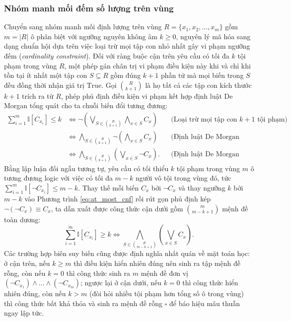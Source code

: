 \subsubsection{Nhóm manh mối đếm số lượng trên vùng}
Chuyển sang nhóm manh mối định lượng trên vùng $R = \{x_1, x_2, \dots, x_m\}$ gồm
$m = |R|$ ô phân biệt với ngưỡng nguyên không âm $k \ge 0$, nguyên lý mã hóa sang
dạng chuẩn hội dựa trên việc loại trừ mọi tập con nhỏ nhất gây vi phạm ngưỡng đếm
(\textit{cardinality constraint}). Đối với ràng buộc cận trên yêu cầu có tối đa
$k$ tội phạm trong vùng $R$, một phép gán chân trị vi phạm điều kiện này khi và
chỉ khi tồn tại ít nhất một tập con $S \subseteq R$ gồm đúng $k + 1$ phần tử mà
mọi biến trong $S$ đều đồng thời nhận giá trị $\text{True}$. Gọi $\binom{R}{k+1}$
là họ tất cả các tập con kích thước $k + 1$ trích ra từ $R$, phép phủ định điều
kiện vi phạm kết hợp định luật De Morgan tổng quát cho ta chuỗi biến đổi tương
đương:
\begin{align}
    \sum_{i=1}^{m} \mathbb{I}[C_{x_i}] \le k
    &\iff \neg \left( \bigvee_{S \in \binom{R}{k+1}} \bigwedge_{x \in S} C_x \right)
        && \text{(Loại trừ mọi tập con $k+1$ tội phạm)} \nonumber\\
    &\iff \bigwedge_{S \in \binom{R}{k+1}} \neg \left( \bigwedge_{x \in S} C_x \right)
        && \text{(Định luật De Morgan ngoài)} \nonumber\\
    &\iff \bigwedge_{S \in \binom{R}{k+1}} \left( \bigvee_{x \in S} \neg C_x \right).
        && \text{(Định luật De Morgan trong)}
    \label{eq:at_most_cnf}
\end{align}
Bằng lập luận đối ngẫu tương tự, yêu cầu có tối thiểu $k$ tội phạm trong vùng $m$
ô tương đương logic với việc có tối đa $m - k$ người vô tội trong vùng đó, tức
$\sum_{i=1}^{m} \mathbb{I}[\neg C_{x_i}] \le m - k$. Thay thế mỗi biến $C_x$ bởi
$\neg C_x$ và thay ngưỡng $k$ bởi $m - k$ vào Phương trình \eqref{eq:at_most_cnf}
rồi rút gọn phủ định kép $\neg(\neg C_x) \equiv C_x$, ta dẫn xuất được công thức
cận dưới gồm $\binom{m}{m-k+1}$ mệnh đề toàn dương:
\begin{equation}
    \sum_{i=1}^{m} \mathbb{I}[C_{x_i}] \ge k
    \iff \bigwedge_{S \in \binom{R}{m-k+1}} \left( \bigvee_{x \in S} C_x \right).
    \label{eq:at_least_cnf}
\end{equation}
Các trường hợp biên suy biến cũng được định nghĩa nhất quán về mặt toán học: ở cận
trên, nếu $k \ge m$ thì điều kiện hiển nhiên đúng nên sinh ra tập mệnh đề rỗng,
còn nếu $k = 0$ thì công thức sinh ra $m$ mệnh đề đơn vị $(\neg C_{x_1}) \wedge
\dots \wedge (\neg C_{x_m})$; ngược lại ở cận dưới, nếu $k = 0$ thì công thức hiển
nhiên đúng, còn nếu $k > m$ (đòi hỏi nhiều tội phạm hơn tổng số ô trong vùng) thì
công thức bất khả thỏa và sinh ra mệnh đề rỗng $\square$ để báo hiệu mâu thuẫn
ngay lập tức.

